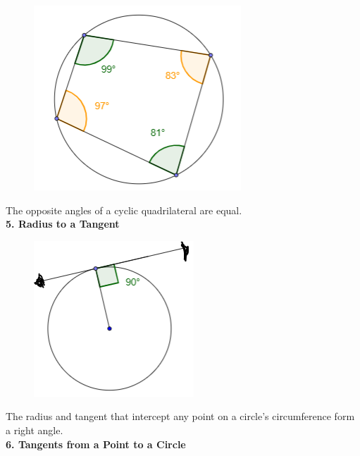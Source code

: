 \documentclass{article}
\begin{document}
            \begin{figure} [hbt!]
                \centering
                \includegraphics[scale=0.6]{Resources/Unit4Circles/circle4.PNG}
            \end{figure}

            \noindent The opposite angles of a cyclic quadrilateral are equal. \\

            \noindent \color{purple}\textbf{5. Radius to a Tangent} \color{black} \\

            \begin{figure} [hbt!]
                \centering
                \includegraphics[scale=0.75]{Resources/Unit4Circles/circle5.PNG}
            \end{figure}

            \noindent The radius and tangent that intercept any point on a circle's circumference
            form a right angle. \\

            \pagebreak
            \noindent \color{purple} \textbf{6. Tangents from a Point to a Circle} \color{black} \\
\end{document}
